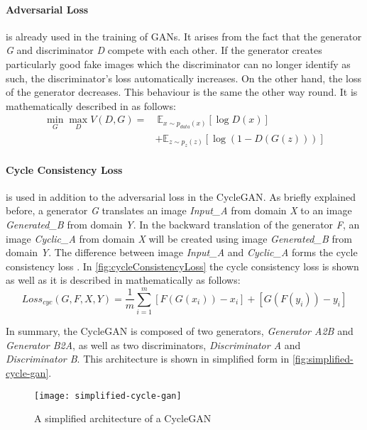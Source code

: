 \documentclass[fleqn,10pt]{SelfArx} %
\begin{document}
\paragraph{Adversarial Loss} is already used in the training of  \ac{GAN}s. It arises from the fact that the generator \textit{G} and discriminator \textit{D} compete with each other. If the generator creates particularly good fake images which the discriminator can no longer identify as such, the discriminator's loss automatically increases. On the other hand, the loss of the generator decreases. This behaviour is the same the other way round. It is mathematically described in \cite{Source-GAN} as follows:
\begin{equation*}
\begin{split}
\min_{G} \max_{D} V(D,G) =&~\mathbb E_{x \sim p_{data}(x)} [\log D(x)] \\\
&+ \mathbb E_{z \sim p_{z}(z)} [\log (1-D(G(z)))]
\end{split}
\end{equation*}

\paragraph{Cycle Consistency Loss} is used in addition to the adversarial loss in the Cycle\ac{GAN}. As briefly explained before, a generator \textit{G} translates an image \textit{Input\_A} from domain \textit{X} to an image \textit{Generated\_B} from domain \textit{Y}. In the backward translation of the generator \textit{F}, an image \textit{Cyclic\_A} from domain \textit{X} will be created using image \textit{Generated\_B} from domain \textit{Y}. The difference between image \textit{Input\_A} and \textit{Cyclic\_A} forms the cycle consistency loss \cite{Introduction-to-Cycle-GANs}. In \autoref{fig:cycleConsistencyLoss} the cycle consistency loss is shown as well as it is described in \cite{Introduction-to-Cycle-GANs} mathematically as follows:
\begin{equation*}
	Loss_{cyc}(G,F,X,Y) = \frac{1}{m} \sum^{m}_{i=1}[F(G(x_i))-x_i]+[G(F(y_i))-y_i]
\end{equation*}

In summary, the Cycle\ac{GAN} is composed of two generators, \textit{Generator A2B} and \textit{Generator B2A}, as well as two discriminators, \textit{Discriminator A} and \textit{Discriminator B}. This architecture is shown in simplified form in \autoref{fig:simplified-cycle-gan}.

\begin{figure}[htb] 
	\centering 
	\texttt{[image: simplified-cycle-gan]}
	\caption{A simplified architecture of a Cycle\ac{GAN} \cite{Introduction-to-Cycle-GANs}}
	\label{fig:simplified-cycle-gan}
\end{figure}
\end{document}
